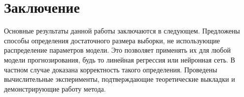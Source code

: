 \section{Заключение}

Основные результаты данной работы заключаются в следующем. Предложены способы определения достаточного размера выборки, не использующие распределение параметров модели. Это позволяет применять их для любой модели прогнозирования, будь то линейная регрессия или нейронная сеть. В частном случае доказана корректность такого определения. Проведены вычислительные эксперименты, подтверждающие теоретические выкладки и демонстрирующие работу метода.